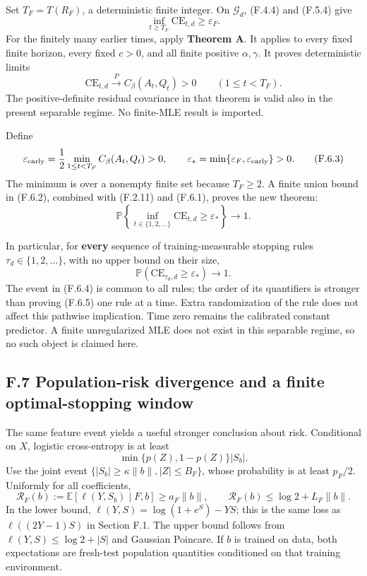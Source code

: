 \documentclass[
  11pt,
  a4paper,
]{article}
\begin{document}
Set \(T_F=T(R_F)\), a deterministic finite integer. On \(\mathcal G_d\),
(F.4.4) and (F.5.4) give \[
\inf_{t\ge T_F}\mathrm{CE}_{t,d}\ge\varepsilon_F.
\tag{F.6.1}
\] For the finitely many earlier times, apply \textbf{Theorem A}. It
applies to every fixed finite horizon, every fixed \(c>0\), and all
finite positive \(\alpha,\gamma\). It proves deterministic limits \[
\mathrm{CE}_{t,d}\xrightarrow{P}C_\beta(A_t,Q_t)>0
\qquad(1\le t<T_F).
\tag{F.6.2}
\] The positive-definite residual covariance in that theorem is valid
also in the present separable regime. No finite-MLE result is imported.

Define \[
\varepsilon_{\rm early}
=\frac12\min_{1\le t<T_F}C_\beta(A_t,Q_t)>0,
\qquad
\varepsilon_* =\min\{\varepsilon_F,\varepsilon_{\rm early}\}>0.
\tag{F.6.3}
\] The minimum is over a nonempty finite set because \(T_F\ge2\). A
finite union bound in (F.6.2), combined with (F.2.11) and (F.6.1),
proves the new theorem: \[
\boxed{\qquad
\mathbb P\!\left\{\inf_{t\in\{1,2,\ldots\}}
\mathrm{CE}_{t,d}\ge\varepsilon_*\right\}\longrightarrow1.
\qquad}
\tag{F.6.4}
\]

In particular, for \textbf{every} sequence of training-measurable
stopping rules \(\tau_d\in\{1,2,\ldots\}\), with no upper bound on their
size, \[
\mathbb P(\mathrm{CE}_{\tau_d,d}\ge\varepsilon_*)\longrightarrow1.
\tag{F.6.5}
\] The event in (F.6.4) is common to all rules; the order of its
quantifiers is stronger than proving (F.6.5) one rule at a time. Extra
randomization of the rule does not affect this pathwise implication.
Time zero remains the calibrated constant predictor. A finite
unregularized MLE does not exist in this separable regime, so no such
object is claimed here.

\hypertarget{f.7-population-risk-divergence-and-a-finite-optimal-stopping-window}{%
\subsection{F.7 Population-risk divergence and a finite optimal-stopping
window}\label{f.7-population-risk-divergence-and-a-finite-optimal-stopping-window}}

The same feature event yields a useful stronger conclusion about risk.
Conditional on \(X\), logistic cross-entropy is at least \[
\min\{p(Z),1-p(Z)\}|S_b|.
\] Use the joint event \(\{|S_b|\ge\kappa\|b\|,|Z|\le B_F\}\), whose
probability is at least \(p_F/2\). Uniformly for all coefficients, \[
\mathcal R_F(b):=\mathbb E[\ell(Y,S_b)\mid F,b]
\ge a_F\|b\|,
\qquad
\mathcal R_F(b)\le\log2+L_F\|b\|.
\tag{F.7.1}
\] In the lower bound, \(\ell(Y,S)=\log(1+e^S)-YS\); this is the same
loss as \(\ell((2Y-1)S)\) in Section F.1. The upper bound follows from
\(\ell(Y,S)\le\log2+|S|\) and Gaussian Poincare. If \(b\) is trained on
data, both expectations are fresh-test population quantities conditioned
on that training environment.
\end{document}
